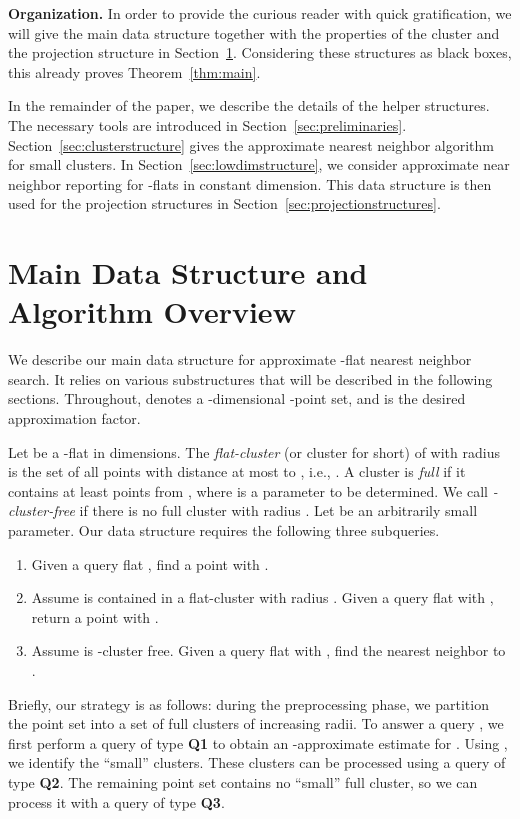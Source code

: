 \documentclass[a4paper,11pt]{paper}
\begin{document}
\noindent
\textbf{Organization.}
In order to provide the curious reader with quick gratification,
we will give the main data structure together with the properties
of the cluster and the projection structure in
Section~\ref{sec:mainDS}.  Considering these structures as
black boxes, this already proves Theorem~\ref{thm:main}.

In the remainder of the paper, we describe the details of the
helper structures. The necessary tools are introduced
in Section~\ref{sec:preliminaries}. Section~\ref{sec:clusterstructure}
gives the approximate nearest neighbor algorithm for small clusters.
In Section~\ref{sec:lowdimstructure}, we consider approximate
near neighbor reporting for -flats in constant dimension.
This data structure is then used for the projection
structures in Section~\ref{sec:projectionstructures}.

\section{Main Data Structure and Algorithm Overview}
\label{sec:mainDS}

We describe our main data structure for approximate
-flat nearest neighbor search. It relies on various substructures
that will be described in the following sections.
Throughout,  denotes a -dimensional -point set,
and  is the desired approximation factor.

Let  be a -flat in  dimensions.
The \textit{flat-cluster}  (or cluster for short)
of  with radius  is
the set of all points with distance at most  to , i.e.,
.
A cluster is \emph{full}
if it contains at least  points from , where  is a
parameter to be determined. We call 
\textit{-cluster-free} if there is no full cluster with
radius .
Let  be an arbitrarily small parameter.
Our data structure requires the following three subqueries.
\begin{enumerate}[\bfseries Q1:]
 \item
\label{itm:q1}
Given a query flat ,
find a point   with .
\item
\label{itm:q2}
Assume  is contained in a flat-cluster with radius .
Given a query flat  with  ,
return a point  with .
\item
\label{itm:q3}
Assume  is -cluster free.
Given  a query flat  with
, find the nearest neighbor  to .
\end{enumerate}

Briefly, our strategy is as follows: during the preprocessing
phase, we partition the point set into a set of full
clusters of increasing radii. To answer a query , we first perform
a query of type \textbf{Q1} to obtain an -approximate
estimate  for . Using ,
we identify the ``small'' clusters. These clusters can be
processed using a query of type \textbf{Q2}.
The remaining point set contains no ``small'' full cluster, so we
can process it with a query of type \textbf{Q3}.
\end{document}
